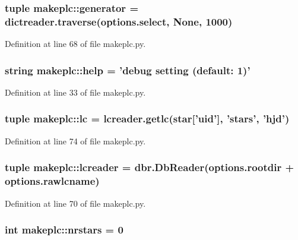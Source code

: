 \hypertarget{namespacemakeplc_a17113af2691a7272ebf921222e1324f5}{
\subsubsection[{generator}]{\setlength{\rightskip}{0pt plus 5cm}tuple {\bf makeplc::generator} = dictreader.traverse(options.select, None, 1000)}}
\label{namespacemakeplc_a17113af2691a7272ebf921222e1324f5}


Definition at line 68 of file makeplc.py.

\hypertarget{namespacemakeplc_a10fe047bfff2e759a4f8901770a6597c}{
\subsubsection[{help}]{\setlength{\rightskip}{0pt plus 5cm}string {\bf makeplc::help} = 'debug setting (default: 1)'}}
\label{namespacemakeplc_a10fe047bfff2e759a4f8901770a6597c}


Definition at line 33 of file makeplc.py.

\hypertarget{namespacemakeplc_af12c0b1bc2c82c6cf31e8b47b879ad3c}{
\subsubsection[{lc}]{\setlength{\rightskip}{0pt plus 5cm}tuple {\bf makeplc::lc} = lcreader.getlc(star\mbox{[}'uid'\mbox{]}, 'stars', 'hjd')}}
\label{namespacemakeplc_af12c0b1bc2c82c6cf31e8b47b879ad3c}


Definition at line 74 of file makeplc.py.

\hypertarget{namespacemakeplc_af91c68b5354b2ec9e425193cbef8c891}{
\subsubsection[{lcreader}]{\setlength{\rightskip}{0pt plus 5cm}tuple {\bf makeplc::lcreader} = dbr.DbReader(options.rootdir + options.rawlcname)}}
\label{namespacemakeplc_af91c68b5354b2ec9e425193cbef8c891}


Definition at line 70 of file makeplc.py.

\hypertarget{namespacemakeplc_a43b5a6c8a05f627a17aa3b40af795fa1}{
\subsubsection[{nrstars}]{\setlength{\rightskip}{0pt plus 5cm}int {\bf makeplc::nrstars} = 0}}
\label{namespacemakeplc_a43b5a6c8a05f627a17aa3b40af795fa1}


